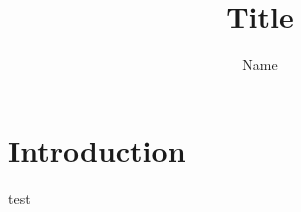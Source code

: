 \documentclass{article}
\title{Title}
\author{Name}
\begin{document}
\maketitle

\section{Introduction}
test
\end{document}
